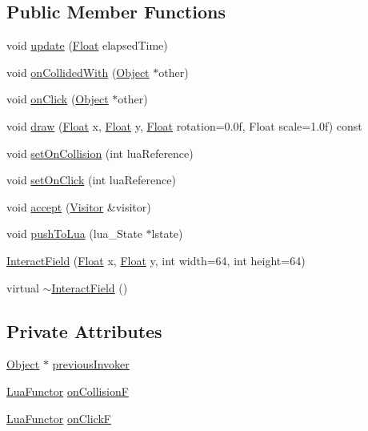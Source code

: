 \subsection*{Public Member Functions}
\begin{DoxyCompactItemize}
\item 
void \hyperlink{classZeta_1_1InteractField_a716063f0c98f54b398a19cd00ceadaca}{update} (\hyperlink{namespaceZeta_a1e0a1265f9b3bd3075fb0fabd39088ba}{Float} elapsed\+Time)
\item 
void \hyperlink{classZeta_1_1InteractField_adb5e9c403bbd371895fd56b6d8dd9d03}{on\+Collided\+With} (\hyperlink{classZeta_1_1Object}{Object} $\ast$other)
\item 
void \hyperlink{classZeta_1_1InteractField_a32087d6a65889ab7910aa16a5a87bc7e}{on\+Click} (\hyperlink{classZeta_1_1Object}{Object} $\ast$other)
\item 
void \hyperlink{classZeta_1_1InteractField_a423e159f4cd90fb7f30ff3a576523b4a}{draw} (\hyperlink{namespaceZeta_a1e0a1265f9b3bd3075fb0fabd39088ba}{Float} x, \hyperlink{namespaceZeta_a1e0a1265f9b3bd3075fb0fabd39088ba}{Float} y, \hyperlink{namespaceZeta_a1e0a1265f9b3bd3075fb0fabd39088ba}{Float} rotation=0.\+0f, Float scale=1.\+0f) const 
\item 
void \hyperlink{classZeta_1_1InteractField_a48b8a49e04f820765d454d27c9f0d1e0}{set\+On\+Collision} (int lua\+Reference)
\item 
void \hyperlink{classZeta_1_1InteractField_a741f908fe8543f89ffe81a68fddd7ee7}{set\+On\+Click} (int lua\+Reference)
\item 
void \hyperlink{classZeta_1_1InteractField_adc1ed059f2ad3943171d83c2ebf1fc98}{accept} (\hyperlink{classZeta_1_1Visitor}{Visitor} \&visitor)
\item 
void \hyperlink{classZeta_1_1InteractField_a8db01310564889f9feb542c1584b6697}{push\+To\+Lua} (lua\+\_\+\+State $\ast$lstate)
\item 
\hyperlink{classZeta_1_1InteractField_a2b9f54d082f516e03631d37cc9261af8}{Interact\+Field} (\hyperlink{namespaceZeta_a1e0a1265f9b3bd3075fb0fabd39088ba}{Float} x, \hyperlink{namespaceZeta_a1e0a1265f9b3bd3075fb0fabd39088ba}{Float} y, int width=64, int height=64)
\item 
virtual \hyperlink{classZeta_1_1InteractField_a93711a1e51107b5d19db8c5380b88cf2}{$\sim$\+Interact\+Field} ()
\end{DoxyCompactItemize}
\subsection*{Private Attributes}
\begin{DoxyCompactItemize}
\item 
\hyperlink{classZeta_1_1Object}{Object} $\ast$ \hyperlink{classZeta_1_1InteractField_a5adb02a1c196e8f715cd63fc2bd9cad2}{previous\+Invoker}
\item 
\hyperlink{classZeta_1_1LuaFunctor}{Lua\+Functor} \hyperlink{classZeta_1_1InteractField_a7c1f68e96ceef6bc5afdb2640f8e19fc}{on\+Collision\+F}
\item 
\hyperlink{classZeta_1_1LuaFunctor}{Lua\+Functor} \hyperlink{classZeta_1_1InteractField_aa3a858d6a7029cb3dc72c70797f610c7}{on\+Click\+F}
\end{DoxyCompactItemize}
